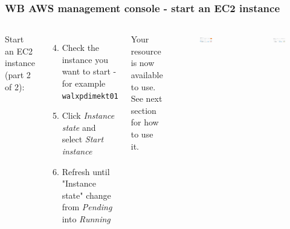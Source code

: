 \documentclass[aspectratio=169]{beamer} %
\newcommand{\ectwoName}{walxpdimekt01}
\begin{document}
\begin{frame}
	\frametitle{WB AWS management console - start an EC2 instance}
	
	\begin{columns}[c]
		
		
		Start an EC2 instance (part 2 of 2):
		
		\begin{enumerate}
			\setcounter{enumi}{3}
			\item Check the instance you want to start - for example \texttt{\ectwoName}
			\item Click \textit{Instance state} and select \textit{Start instance}
			\item Refresh until "Instance state" change from \textit{Pending} into \textit{Running}
		\end{enumerate}
		
		Your resource is now available to use. See next section for how to use it.

		\begin{figure}
			\centering
			\includegraphics[width=1\textwidth]{./img/ec2-2.png}
		\end{figure}
		\begin{figure}
			\centering
			\includegraphics[width=1\textwidth]{./img/ec2-3.png}
		\end{figure}
		\vspace{.5cm}
		
	\end{columns}
\end{frame}
\end{document}
